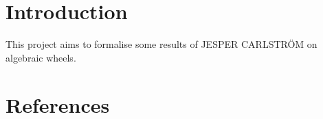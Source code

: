%
\chapter{Introduction}
This project aims to formalise some results of JESPER CARLSTRÖM on algebraic wheels\cite{CARLSTRÖM_2004}.

\chapter{References}
\printbibliography